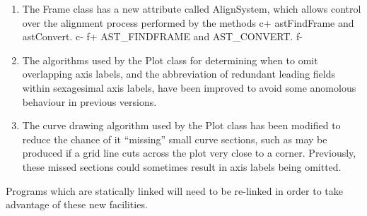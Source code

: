 \documentclass[twoside,11pt]{article}
\begin{document}
\begin{enumerate}
\item The Frame class has a new attribute called AlignSystem, which allows 
control over the alignment process performed by the methods 
c+
astFindFrame and astConvert.
c-
f+
AST\_FINDFRAME and AST\_CONVERT.
f-

\item The algorithms used by the Plot class for determining when to omit
overlapping axis labels, and the abbreviation of redundant leading fields 
within sexagesimal axis labels, have been improved to avoid some anomolous
behaviour in previous versions.

\item The curve drawing algorithm used by the Plot class has been
modified to reduce the chance of it ``missing'' small curve sections,
such as may be produced if a grid line cuts across the plot very close to
a corner. Previously, these missed sections could sometimes result in 
axis labels being omitted.

\end{enumerate}

Programs which are statically linked will need to be re-linked in
order to take advantage of these new facilities.
\end{document}
